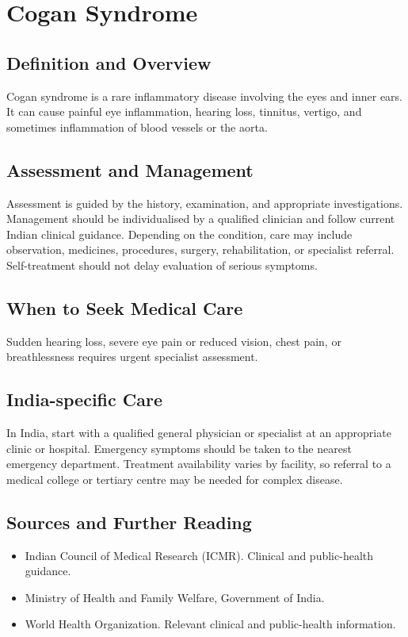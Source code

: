 \chapter{Cogan Syndrome}

\section*{Definition and Overview}
Cogan syndrome is a rare inflammatory disease involving the eyes and inner ears. It can cause painful eye inflammation, hearing loss, tinnitus, vertigo, and sometimes inflammation of blood vessels or the aorta.

\section*{Assessment and Management}
Assessment is guided by the history, examination, and appropriate investigations. Management should be individualised by a qualified clinician and follow current Indian clinical guidance. Depending on the condition, care may include observation, medicines, procedures, surgery, rehabilitation, or specialist referral. Self-treatment should not delay evaluation of serious symptoms.

\section*{When to Seek Medical Care}
Sudden hearing loss, severe eye pain or reduced vision, chest pain, or breathlessness requires urgent specialist assessment.

\section*{India-specific Care}
In India, start with a qualified general physician or specialist at an appropriate clinic or hospital. Emergency symptoms should be taken to the nearest emergency department. Treatment availability varies by facility, so referral to a medical college or tertiary centre may be needed for complex disease.

\section*{Sources and Further Reading}
\begin{itemize}
    \item Indian Council of Medical Research (ICMR). Clinical and public-health guidance.
    \item Ministry of Health and Family Welfare, Government of India.
    \item World Health Organization. Relevant clinical and public-health information.
\end{itemize}

